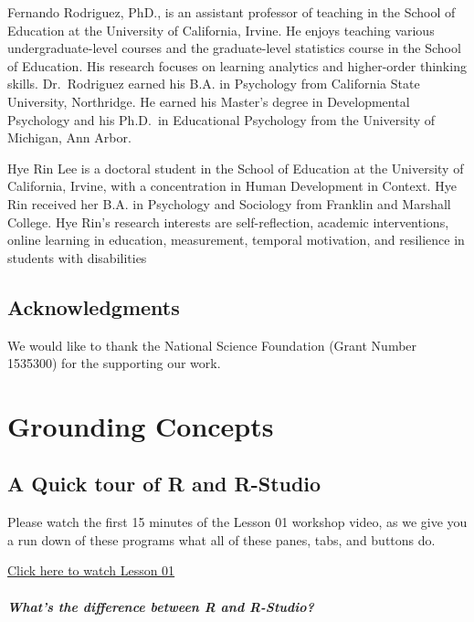 \documentclass[
]{book}
\begin{document}
Fernando Rodriguez, PhD., is an assistant professor of teaching in the School of Education at the University of California, Irvine. He enjoys teaching various undergraduate-level courses and the graduate-level statistics course in the School of Education. His research focuses on learning analytics and higher-order thinking skills. Dr.~Rodriguez earned his B.A. in Psychology from California State University, Northridge. He earned his Master's degree in Developmental Psychology and his Ph.D.~in Educational Psychology from the University of Michigan, Ann Arbor.

Hye Rin Lee is a doctoral student in the School of Education at the University of California, Irvine, with a concentration in Human Development in Context. Hye Rin received her B.A. in Psychology and Sociology from Franklin and Marshall College. Hye Rin's research interests are self-reflection, academic interventions, online learning in education, measurement, temporal motivation, and resilience in students with disabilities

\hypertarget{acknowledgments}{%
\section{Acknowledgments}\label{acknowledgments}}

We would like to thank the National Science Foundation (Grant Number 1535300) for the supporting our work.

\hypertarget{grounding-concepts}{%
\chapter{Grounding Concepts}\label{grounding-concepts}}

\hypertarget{a-quick-tour-of-r-and-r-studio}{%
\section{A Quick tour of R and R-Studio}\label{a-quick-tour-of-r-and-r-studio}}

Please watch the first 15 minutes of the Lesson 01 workshop video, as we give you a run down of these programs what all of these panes, tabs, and buttons do.

\href{https://drive.google.com/file/d/1EYdeTYf1h-wI759Ci6w2ckWNjc194LT3/view?usp=sharing}{Click here to watch Lesson 01}

\hypertarget{whats-the-difference-between-r-and-r-studio}{%
\subsubsection{\texorpdfstring{\emph{What's the difference between R and R-Studio?}}{What's the difference between R and R-Studio?}}\label{whats-the-difference-between-r-and-r-studio}}
\end{document}
